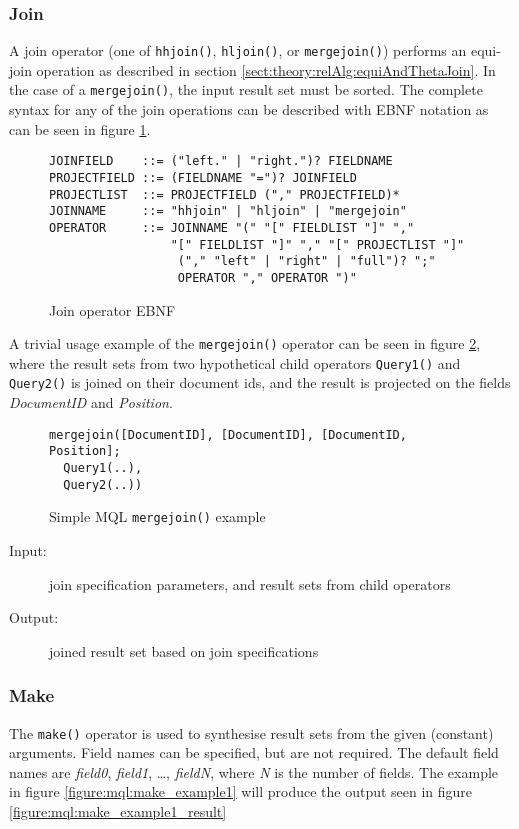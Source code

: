 \subsubsection{Join}
A join operator (one of \texttt{hhjoin()}, \texttt{hljoin()}, or
\texttt{mergejoin()}) performs an equi-join operation as described in section
\ref{sect:theory:relAlg:equiAndThetaJoin}. In the case of a
\texttt{mergejoin()}, the input result set must be sorted. The complete syntax
for any of the join operations can be described with EBNF notation as can be
seen in figure \ref{figure:mql:ebnf:join}.
\begin{figure}[!h]
\centering
\begin{Verbatim}
JOINFIELD    ::= ("left." | "right.")? FIELDNAME
PROJECTFIELD ::= (FIELDNAME "=")? JOINFIELD
PROJECTLIST  ::= PROJECTFIELD ("," PROJECTFIELD)*
JOINNAME     ::= "hhjoin" | "hljoin" | "mergejoin"
OPERATOR     ::= JOINNAME "(" "[" FIELDLIST "]" "," 
                 "[" FIELDLIST "]" "," "[" PROJECTLIST "]"
                  ("," "left" | "right" | "full")? ";"
                  OPERATOR "," OPERATOR ")"
\end{Verbatim}
\caption{Join operator EBNF}
\label{figure:mql:ebnf:join}
\end{figure}
A trivial usage example of the \texttt{mergejoin()} operator can be seen in
figure \ref{figure:mql:mergejoin_example}, where the result sets from two
hypothetical child operators \texttt{Query1()} and \texttt{Query2()} is joined
on their document ids, and the result is projected on the
fields \textit{DocumentID} and \textit{Position}.

\begin{figure}[!h]
\centering
\begin{Verbatim}
mergejoin([DocumentID], [DocumentID], [DocumentID, Position]; 
  Query1(..),
  Query2(..))
\end{Verbatim}
\caption{Simple MQL \texttt{mergejoin()} example}
\label{figure:mql:mergejoin_example}
\end{figure}

\begin{description}
  \item[Input:] join specification parameters, and result sets from child
operators
  \item[Output:] joined result set based on join specifications
\end{description}

\subsubsection{Make}
The \texttt{make()} operator is used to synthesise result sets from the given
(constant) arguments. Field names can be specified, but are not required. The
default field names are \textit{field0}, \textit{field1}, \ldots,
\textit{fieldN}, where \textit{N} is the number of fields. The example in
figure \ref{figure:mql:make_example1} will produce the output seen in figure
\ref{figure:mql:make_example1_result}

